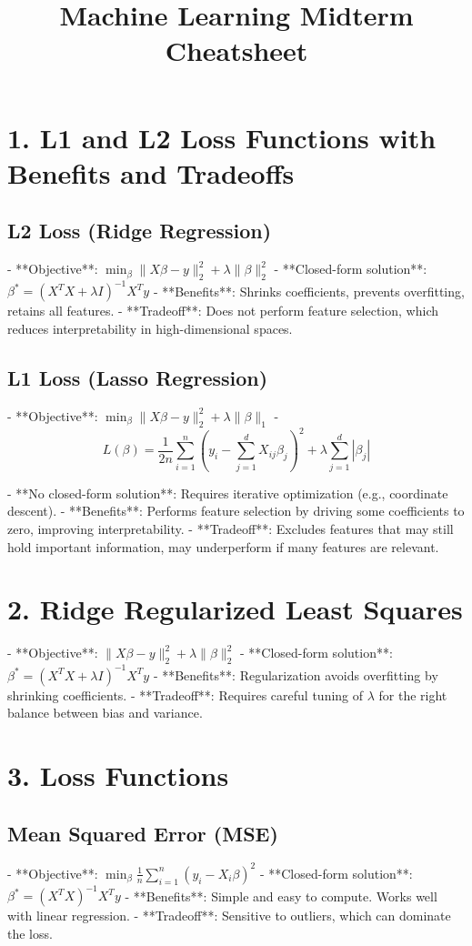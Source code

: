 \documentclass[10pt]{article}
\title{\vspace{-2cm} Machine Learning Midterm Cheatsheet}
\date{}
\begin{document}
\footnotesize
\begin{multicols}{2}

\section*{1. L1 and L2 Loss Functions with Benefits and Tradeoffs}
\subsection*{L2 Loss (Ridge Regression)}
- **Objective**: $\min_{\beta} \|X\beta - y\|_2^2 + \lambda \|\beta\|_2^2$
- **Closed-form solution**: $\beta^* = (X^TX + \lambda I)^{-1}X^Ty$
- **Benefits**: Shrinks coefficients, prevents overfitting, retains all features.
- **Tradeoff**: Does not perform feature selection, which reduces interpretability in high-dimensional spaces.

\subsection*{L1 Loss (Lasso Regression)}
- **Objective**: $\min_{\beta} \|X\beta - y\|_2^2 + \lambda \|\beta\|_1$
- \[
L(\beta) = \frac{1}{2n} \sum_{i=1}^{n} \left( y_i - \sum_{j=1}^{d} X_{ij} \beta_j \right)^2 + \lambda \sum_{j=1}^{d} |\beta_j|
\]

- **No closed-form solution**: Requires iterative optimization (e.g., coordinate descent).
- **Benefits**: Performs feature selection by driving some coefficients to zero, improving interpretability.
- **Tradeoff**: Excludes features that may still hold important information, may underperform if many features are relevant.

\section*{2. Ridge Regularized Least Squares}
- **Objective**: $\|X\beta - y\|_2^2 + \lambda\|\beta\|_2^2$
- **Closed-form solution**: $\beta^* = (X^TX + \lambda I)^{-1}X^Ty$
- **Benefits**: Regularization avoids overfitting by shrinking coefficients.
- **Tradeoff**: Requires careful tuning of \(\lambda\) for the right balance between bias and variance.

\section*{3. Loss Functions}
\subsection*{Mean Squared Error (MSE)}
- **Objective**: $\min_{\beta} \frac{1}{n} \sum_{i=1}^{n} (y_i - X_i\beta)^2$
- **Closed-form solution**: $\beta^* = (X^TX)^{-1}X^Ty$
- **Benefits**: Simple and easy to compute. Works well with linear regression.
- **Tradeoff**: Sensitive to outliers, which can dominate the loss.


\end{multicols}
\end{document}
